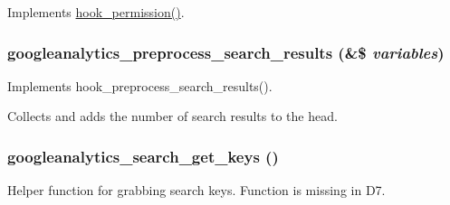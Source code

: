 \label{googleanalytics_8module_ae66161f9d90584b809a6a68445ba4da7}
Implements \hyperlink{group__hooks_ga2b22b45f4925f2478412477bae329713}{hook\_\-permission()}. \hypertarget{googleanalytics_8module_af643e5263879dfd58196eca6e850edc5}{
\subsubsection[{googleanalytics\_\-preprocess\_\-search\_\-results}]{\setlength{\rightskip}{0pt plus 5cm}googleanalytics\_\-preprocess\_\-search\_\-results (\&\$ {\em variables})}}
\label{googleanalytics_8module_af643e5263879dfd58196eca6e850edc5}
Implements hook\_\-preprocess\_\-search\_\-results().

Collects and adds the number of search results to the head. \hypertarget{googleanalytics_8module_a92c9e263a13d97031e1597db4f43af48}{
\subsubsection[{googleanalytics\_\-search\_\-get\_\-keys}]{\setlength{\rightskip}{0pt plus 5cm}googleanalytics\_\-search\_\-get\_\-keys ()}}
\label{googleanalytics_8module_a92c9e263a13d97031e1597db4f43af48}
Helper function for grabbing search keys. Function is missing in D7.

